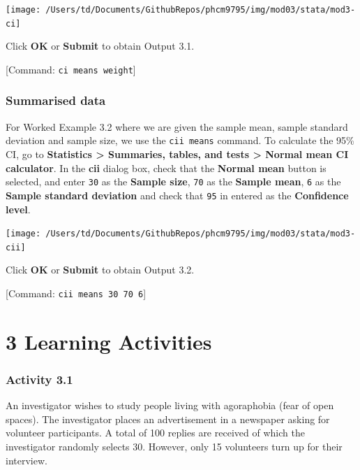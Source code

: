\documentclass[
]{memoir}
\begin{document}
\texttt{[image: /Users/td/Documents/GithubRepos/phcm9795/img/mod03/stata/mod3-ci]}

Click \textbf{OK} or \textbf{Submit} to obtain Output 3.1.

{[}Command: \texttt{ci\ means\ weight}{]}

\hypertarget{summarised-data}{%
\subsection{Summarised data}\label{summarised-data}}

For Worked Example 3.2 where we are given the sample mean, sample standard deviation and sample size, we use the \texttt{cii\ means} command. To calculate the 95\% CI, go to \textbf{Statistics \textgreater{} Summaries, tables, and tests \textgreater{} Normal mean CI calculator}. In the \textbf{cii} dialog box, check that the \textbf{Normal mean} button is selected, and enter \texttt{30} as the \textbf{Sample size}, \texttt{70} as the \textbf{Sample mean}, \texttt{6} as the \textbf{Sample standard deviation} and check that \texttt{95} in entered as the \textbf{Confidence level}.

\texttt{[image: /Users/td/Documents/GithubRepos/phcm9795/img/mod03/stata/mod3-cii]}

Click \textbf{OK} or \textbf{Submit} to obtain Output 3.2.

{[}Command: \texttt{cii\ means\ 30\ 70\ 6}{]}

\hypertarget{learning-activities-2}{%
\chapter*{\texorpdfstring{\textbf{3} Learning Activities}{3 Learning Activities}}\label{learning-activities-2}}

\hypertarget{activity-3.1}{%
\subsection*{Activity 3.1}\label{activity-3.1}}

An investigator wishes to study people living with agoraphobia (fear of open spaces). The investigator places an advertisement in a newspaper asking for volunteer participants. A total of 100 replies are received of which the investigator randomly selects 30. However, only 15 volunteers turn up for their interview.
\end{document}
